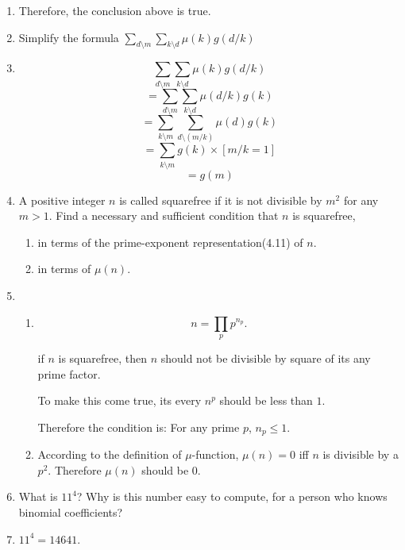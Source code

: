 \documentclass[12pt,a4paper]{article}
\makeatletter
\newtheorem*{solution}{Solution}
\theoremstyle{definition}
\renewenvironment{solution}[1][Solution] {\par\pushQED{\qed}\normalfont\topsep6\p@\@plus6\p@\relax\trivlist\item[\hskip\labelsep\bfseries#1\@addpunct{.}]\ignorespaces}{\popQED\endtrivlist\@endpefalse} \makeatother
\makeatother
\begin{document}
\begin{enumerate}
\begin{solution}
	    	      Therefore, the conclusion above is true.
        \end{solution}
	\item 
	    Simplify the formula $\sum_{d\setminus m}\sum_{k\setminus d}\mu(k)g(d/k)$
	    \begin{solution}
	    	\begin{equation}
	    	    \sum_{d\setminus m}\sum_{k\setminus d}\mu(k)g(d/k)
	    	\end{equation}
	    	\begin{equation*}
	    	    =\sum_{d\setminus m}\sum_{k\setminus d}\mu(d/k)g(k)
	    	\end{equation*}
	    	\begin{equation*}
	    	    =\sum_{k\setminus m}\sum_{d\setminus (m/k)} \mu(d)g(k)
	    	\end{equation*}
	    	\begin{equation*}
	    	    =\sum_{k\setminus m}g(k)\times[m/k=1]
	    	\end{equation*}
	    	\begin{equation*}
	    	    =g(m)
	    	\end{equation*}
	    \end{solution}
	\item 
	    A positive integer $n$ is called squarefree if it is not divisible by $m^2$ for any $m>1$. Find a necessary and sufficient condition that $n$ is squarefree,
	    \begin{enumerate}
	    	\item
	    	    in terms of the prime-exponent representation(4.11) of $n$.
	    	\item 
	    	    in terms of $\mu(n)$.
	    \end{enumerate}
        \begin{solution}
        	\begin{enumerate}
        		\item
        		    \begin{equation*}
        		    n=\prod_{p}p^{n_p}.
        		    \end{equation*}
        		    
        		    if $n$ is squarefree, then $n$ should not be divisible by square of its any prime factor.
        		    
        		    To make this come true, its every $n^p$ should be less than $1$.
        		    
        		    Therefore the condition is: For any prime $p$, $n_p\le1$.
        		\item 
        		    According to the definition of $\mu$-function, $\mu(n)=0$ iff $n$ is divisible by a $p^2$.
        		    Therefore $\mu(n)$ should be $0$.
        	\end{enumerate}
        \end{solution}
    \item 
        What is $11^4$? Why is this number easy to compute, for a person who knows binomial coefficients?
        \begin{solution}
        	$11^4=14641$.
        	

\end{solution}
\end{enumerate}
\end{document}
